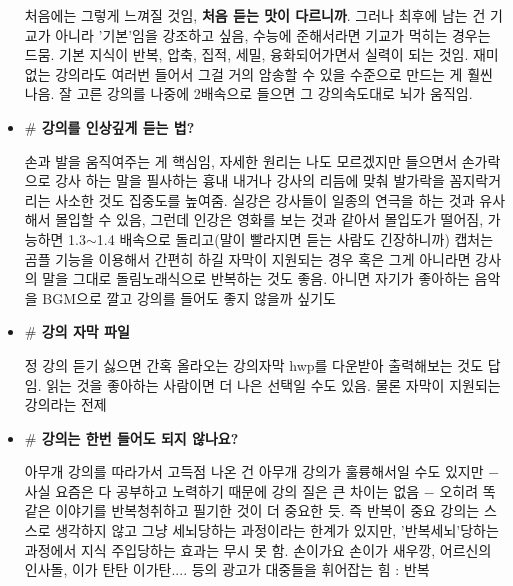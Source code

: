 \begin{itemize}
    처음에는 그렇게 느껴질 것임, \textbf{처음 듣는 맛이 다르니까}.
    그러나 최후에 남는 건 기교가 아니라 '기본'임을 강조하고 싶음, 수능에 준해서라면 기교가 먹히는 경우는 드뭄.
    기본 지식이 반복, 압축, 집적, 세밀, 융화되어가면서 실력이 되는 것임.
    재미없는 강의라도 여러번 들어서 그걸 거의 암송할 수 있을 수준으로 만드는 게 훨씬 나음.
    잘 고른 강의를 나중에 2배속으로 들으면 그 강의속도대로 뇌가 움직임.
    \vspace{5mm}

    \item[] \textbf{$\#$ 강의를 인상깊게 듣는 법?}
    \vspace{5mm}

    손과 발을 움직여주는 게 핵심임, 자세한 원리는 나도 모르겠지만 들으면서 손가락으로 강사 하는 말을 필사하는 흉내 내거나
    강사의 리듬에 맞춰 발가락을 꼼지락거리는 사소한 것도 집중도를 높여줌.
    실강은 강사들이 일종의 연극을 하는 것과 유사해서 몰입할 수 있음, 그런데 인강은 영화를 보는 것과 같아서 몰입도가 떨어짐,
    가능하면 1.3$\sim$1.4 배속으로 돌리고(말이 빨라지면 듣는 사람도 긴장하니까) 캡처는 곰플 기능을 이용해서 간편히 하길
    자막이 지원되는 경우 혹은 그게 아니라면 강사의 말을 그대로 돌림노래식으로 반복하는 것도 좋음.
    아니면 자기가 좋아하는 음악을 BGM으로 깔고 강의를 들어도 좋지 않을까 싶기도
    \vspace{5mm}

    \item[] \textbf{$\#$ 강의 자막 파일}
    \vspace{5mm}

    정 강의 듣기 싫으면 간혹 올라오는 강의자막 hwp를 다운받아 출력해보는 것도 답임.
    읽는 것을 좋아하는 사람이면 더 나은 선택일 수도 있음.
    물론 자막이 지원되는 강의라는 전제
    \vspace{5mm}

    \item[] \textbf{$\#$ 강의는 한번 들어도 되지 않나요?}
    \vspace{5mm}

    아무개 강의를 따라가서 고득점 나온 건 아무개 강의가 훌륭해서일 수도 있지만
    $-$ 사실 요즘은 다 공부하고 노력하기 때문에 강의 질은 큰 차이는 없음 $-$
    오히려 똑같은 이야기를 반복청취하고 필기한 것이 더 중요한 듯. 즉 반복이 중요
    강의는 스스로 생각하지 않고 그냥 세뇌당하는 과정이라는 한계가 있지만,
    '반복세뇌'당하는 과정에서 지식 주입당하는 효과는 무시 못 함.
    손이가요 손이가 새우깡, 어르신의 인사돌, 이가 탄탄 이가탄.... 등의 광고가 대중들을 휘어잡는 힘 : 반복
    \vspace{5mm}

\end{itemize}




